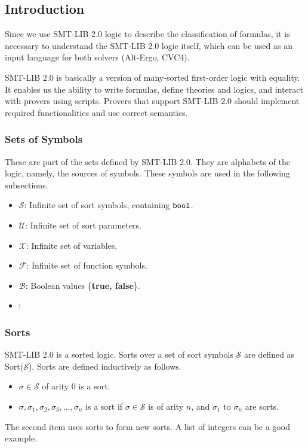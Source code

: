 \documentclass[10pt,letter]{article}
\theoremstyle{definition}
\begin{document}
\subsection{Introduction}

Since we use SMT-LIB 2.0 logic to describe the classification of formulas, it is necessary to understand the SMT-LIB 2.0 logic itself, which can be used as an input language for both solvers (Alt-Ergo, CVC4).

SMT-LIB 2.0 is basically a version of many-sorted first-order logic with equality\cite{bs2010}. It enables us the ability to write formulas, define theories and logics, and interact with provers using scripts. Provers that support SMT-LIB 2.0 should implement required functionalities and use correct semantics.

\subsubsection{Sets of Symbols}

These are part of the sets defined by SMT-LIB 2.0\cite{barrett:smt-lib:2010}. They are alphabets of the logic, namely, the sources of symbols. These symbols are used in the following subsections.
\begin{itemize}
\item $\mathcal{S}$: Infinite set of sort symbols, containing $\tt bool$.
\item $\mathcal{U}$: Infinite set of sort parameters.
\item $\mathcal{X}$: Infinite set of variables.
\item $\mathcal{F}$: Infinite set of function symbols.
\item $\mathcal{B}$: Boolean values \{{\bf true, false}\}.
\item \qquad$\vdots$
\end{itemize}



\subsubsection{Sorts}

SMT-LIB 2.0 is a sorted logic. Sorts over a set of sort symbols $\mathcal{S}$ are defined as Sort($\mathcal{S}$). Sorts are defined inductively as follows.

\begin{itemize}
\item $\sigma \in \mathcal{S}$ of arity 0 is a sort.
\item $\sigma,\sigma_1, \sigma_2, \sigma_3, \ldots, \sigma_n$ is a sort if $\sigma \in \mathcal{S}$ is of arity $n$, and $\sigma_1$ to $\sigma_n$ are sorts.
\end{itemize}
The second item uses sorts to form new sorts. A list of integers can be a good example.
\end{document}
